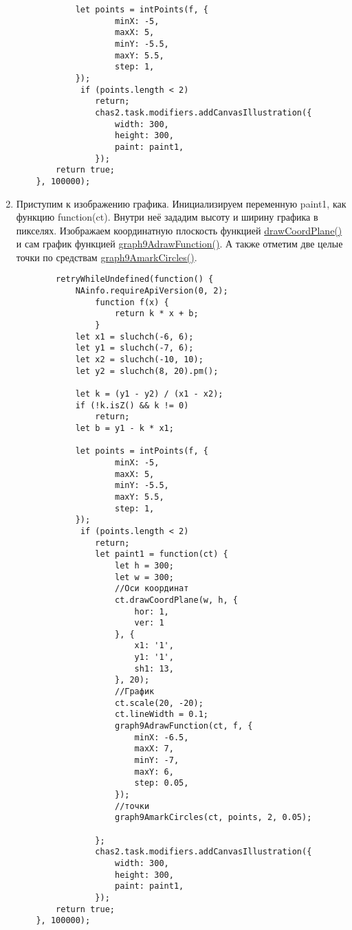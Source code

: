 \begin{enumerate}
\begin{verbatim}
            let points = intPoints(f, {
		            minX: -5,
		            maxX: 5,
		            minY: -5.5,
		            maxY: 5.5,
		            step: 1,
	        });
	         if (points.length < 2)
		        return;
                chas2.task.modifiers.addCanvasIllustration({
                    width: 300,
                    height: 300,
                    paint: paint1,
                });
        return true;
    }, 100000);
        \end{verbatim}
    \item Приступим к изображению графика. Инициализируем переменную paint1, как функцию function(ct). Внутри неё зададим высоту и ширину графика в пикселях.
          Изображаем координатную плоскость функцией \hyperlink{drawCoordPlane}{drawCoordPlane()} и сам график функцией \hyperlink{graph9AdrawFunction}{graph9AdrawFunction()}. А также отметим две целые точки по средствам \hyperlink{graph9AmarkCircles}{graph9AmarkCircles()}.
          \begin{verbatim}
        retryWhileUndefined(function() {
            NAinfo.requireApiVersion(0, 2);
                function f(x) {
                    return k * x + b;
                }
            let x1 = sluchch(-6, 6);
            let y1 = sluchch(-7, 6);
            let x2 = sluchch(-10, 10);
            let y2 = sluchch(8, 20).pm();
    
            let k = (y1 - y2) / (x1 - x2);
            if (!k.isZ() && k != 0)
                return;
            let b = y1 - k * x1;

            let points = intPoints(f, {
		            minX: -5,
		            maxX: 5,
		            minY: -5.5,
		            maxY: 5.5,
		            step: 1,
	        });
	         if (points.length < 2)
		        return;
                let paint1 = function(ct) {
                    let h = 300;
                    let w = 300;
                    //Оси координат
                    ct.drawCoordPlane(w, h, {
                        hor: 1,
                        ver: 1
                    }, {
                        x1: '1',
                        y1: '1',
                        sh1: 13,
                    }, 20);
                    //График
                    ct.scale(20, -20);
                    ct.lineWidth = 0.1;
                    graph9AdrawFunction(ct, f, {
                        minX: -6.5,
                        maxX: 7,
                        minY: -7,
                        maxY: 6,
                        step: 0.05,
                    });
                    //точки
                    graph9AmarkCircles(ct, points, 2, 0.05);

                };
                chas2.task.modifiers.addCanvasIllustration({
                    width: 300,
                    height: 300,
                    paint: paint1,
                });
        return true;
    }, 100000);
        \end{verbatim}
\end{enumerate}
